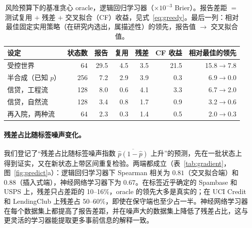 \documentclass[runningheads]{llncs}
\begin{document}
\begin{table}[t]
\caption{风险预算下的基准贪心 oracle，逻辑回归学习器（$\times10^{-3}$ Brier）。报告差距 $=$ 测试复用 $+$ 残差 $+$ 交叉拟合（CF）收益，见式~\eqref{eq:greedy}。最后一列：相对最佳固定实用策略（在研究内选出，属描述性）的领先，报告值 $\to$ 交叉拟合值。}
\label{tab:known}
\centering\scriptsize
\setlength{\tabcolsep}{3.5pt}
\begin{tabular}{lrrrrrr}
\toprule
设定 & 状态数 & 报告 & 复用 & 残差 & CF 收益 & 相对最佳的领先 \\
\midrule
受控世界 & 64 & 29.5 & 4.5 & 3.5 & 21.5 & 15.8$\to$7.8 \\
半合成（已知 $p$） & 256 & 7.2 & 2.9 & 3.9 & 0.3 & 6.9$\to$0.0 \\
信贷，工程流 & 128 & 8.0 & 0.6 & 4.1 & 3.3 & 6.7$\to$2.0 \\
信贷，自然流 & 128 & 3.4 & 0.8 & 1.7 & 0.9 & 3.2$\to$0.6 \\
再入院，两种流 & 64 & 2.3 & 0.3 & 1.4 & 0.5 & 2.0$\to$0.3 \\
\bottomrule
\end{tabular}
\end{table}

\paragraph{残差占比随标签噪声变化。}我们登记了“残差占比随标签噪声指数 $\overline{\hat p(1-\hat p)}$ 上升”的预测，先在一批状态上得到证实，又在新状态上带区间重复检验。两端都成立（表~\ref{tab:gradient}，图~\ref{fig:predict}a）：逻辑回归学习器下 Spearman 相关为 $0.81$（交叉拟合端）和 $0.88$（插入式端），神经网络学习器下为 $0.67$。在标签近乎确定的 Spambase 和 USPS 上，残差只占差距的 10--16\%，oracle 的领先大多是真实的；在 UCI Credit 和 LendingClub 上残差占 50--60\%，即使在保守端也至少占一半。神经网络学习器在每个数据集上都提高了报告差距，并在噪声大的数据集上降低了残差占比，这与更灵活的学习器能提取更多事前信息的解释一致。
\end{document}
